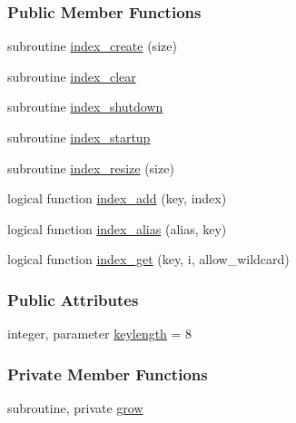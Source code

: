 \subsubsection*{Public Member Functions}
\begin{DoxyCompactItemize}
\item 
subroutine \hyperlink{classindexer_aa83f2bc15a2dfefd22f4fe96975fd213}{index\-\_\-create} (size)
\item 
subroutine \hyperlink{classindexer_ac760937d1c86952d78fe2f8ee82c0264}{index\-\_\-clear}
\item 
subroutine \hyperlink{classindexer_a4cce7876bef972397287dca4891b5bf6}{index\-\_\-shutdown}
\item 
subroutine \hyperlink{classindexer_ab19365de06cdf14ef4e107ca53d797f8}{index\-\_\-startup}
\item 
subroutine \hyperlink{classindexer_a4c6bb664b3ca6a455aedaed8b6e501fd}{index\-\_\-resize} (size)
\item 
logical function \hyperlink{classindexer_a3881b2e3e31c5a3e188e90ad8bc96405}{index\-\_\-add} (key, index)
\item 
logical function \hyperlink{classindexer_a3e8bf237f06d4129457654b6c076f3b7}{index\-\_\-alias} (alias, key)
\item 
logical function \hyperlink{classindexer_a3b93040983a622421fa918a6af566c93}{index\-\_\-get} (key, i, allow\-\_\-wildcard)
\end{DoxyCompactItemize}
\subsubsection*{Public Attributes}
\begin{DoxyCompactItemize}
\item 
integer, parameter \hyperlink{classindexer_a7d27658efaa0adbd2ff73e05efd3e12d}{keylength} = 8
\end{DoxyCompactItemize}
\subsubsection*{Private Member Functions}
\begin{DoxyCompactItemize}
\item 
subroutine, private \hyperlink{classindexer_ab6c32d13a4bcca7f5411d6d097cf5cd8}{grow}
\end{DoxyCompactItemize}
